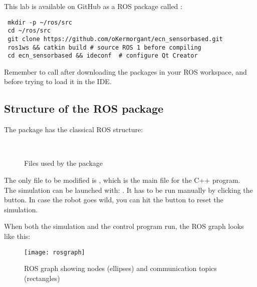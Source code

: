 \documentclass{ecnreport}
\begin{document}
This lab is available on GitHub as a ROS package called :
\begin{center}\bashstyle
\begin{lstlisting}
 mkdir -p ~/ros/src
 cd ~/ros/src
 git clone https://github.com/oKermorgant/ecn_sensorbased.git
 ros1ws && catkin build # source ROS 1 before compiling
 cd ecn_sensorbased && ideconf  # configure Qt Creator
\end{lstlisting}
\end{center}
Remember to call {} after downloading the packages in your ROS workspace, and before trying to load it in the IDE.

\subsection{Structure of the  ROS package}

The package has the classical ROS structure:
\begin{figure}[h]
\begin{minipage}{.25\linewidth} ~ \end{minipage}
\begin{minipage}{.5\linewidth}
\end{minipage}
\caption{Files used by the package}
\end{figure}

The only file to be modified is , which is the main file for the C++ program. \\
The simulation can be launched with: . It has to be run manually by clicking the  button.
In case the robot goes wild, you can hit the  button to reset the simulation.

When both the simulation and the control program run, the ROS graph looks like this:

\begin{figure}[h!]\centering
 \texttt{[image: rosgraph]}
 \caption{ROS graph showing nodes (ellipses) and communication topics (rectangles)}
 \label{fig:rosgraph}
\end{figure}
\end{document}
